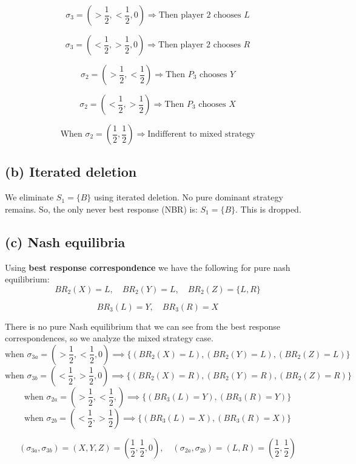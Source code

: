 \documentclass{article}
\begin{document}
\[
\sigma_3 = \left( >\frac{1}{2}, <\frac{1}{2}, 0 \right) \Rightarrow \text{Then player 2 chooses } L
\]

\[
\sigma_3 = \left( <\frac{1}{2}, >\frac{1}{2}, 0 \right) \Rightarrow \text{Then player 2 chooses } R
\]

\[
\sigma_2 = \left( >\frac{1}{2}, <\frac{1}{2} \right) \Rightarrow \text{Then } P_3 \text{ chooses } Y
\]

\[
\sigma_2 = \left( <\frac{1}{2}, >\frac{1}{2} \right) \Rightarrow \text{Then } P_3 \text{ chooses } X
\]

\[
\text{When } \sigma_2 = \left(\frac{1}{2}, \frac{1}{2} \right) \Rightarrow \text{Indifferent to mixed strategy}
\]

\subsection*{(b) Iterated deletion}

We eliminate \( S_1 = \{B\} \) using iterated deletion. No pure dominant strategy remains. So, the only never best response (NBR) is: \( S_1 = \{B\} \). This is dropped.

\subsection*{(c) Nash equilibria}
Using \textbf{best response correspondence} we have the following for pure nash equilibrium:
\[
BR_2(X) = L, \quad BR_2(Y) = L, \quad BR_2(Z) = \{L, R\}
\]

\[
BR_3(L) = Y, \quad BR_3(R) = X
\]
\vspace{2mm}

There is no pure Nash equilibrium that we can see from the best response correspondences, so we analyze the mixed strategy case.
\vspace{2mm}
\[
\text{when } \sigma_{3a} = \left( >\frac{1}{2}, <\frac{1}{2}, 0 \right) \implies \{(BR_2(X) = L), (BR_2(Y) = L), (BR_2(Z) = L)\}
\]
\[
\text{when } \sigma_{3b} = \left( <\frac{1}{2}, >\frac{1}{2}, 0 \right) \implies \{(BR_2(X) = R), (BR_2(Y) = R), (BR_2(Z) = R)\}
\]
\[
\text{when } \sigma_{2a} = \left( >\frac{1}{2}, <\frac{1}{2}, \right) \implies \{(BR_3(L) = Y), (BR_3(R) = Y)\}
\]
\[
\text{when } \sigma_{2b} = \left( <\frac{1}{2}, >\frac{1}{2} \right) \implies \{(BR_3(L) = X), (BR_3(R) = X)\}
\]

\[
(\sigma_{3a}, \sigma_{3b}) = (X, Y, Z) = \left(\frac{1}{2}, \frac{1}{2}, 0\right), \quad (\sigma_{2a}, \sigma_{2b}) =  (L, R) = \left(\frac{1}{2}, \frac{1}{2}\right)
\] \\
\end{document}
